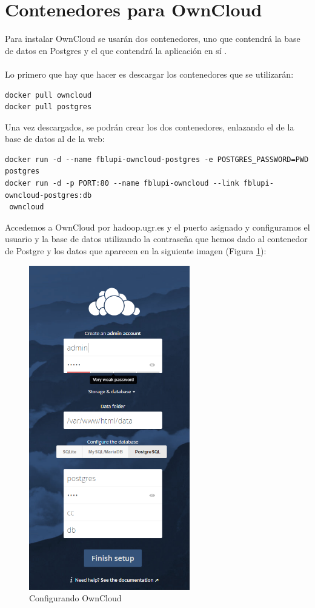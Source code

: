 \section{Contenedores para OwnCloud}

Para instalar OwnCloud se usarán dos contenedores, uno que contendrá la base de datos en Postgres y el que contendrá la aplicación en sí \cite{DockerOwnCloud}.
\\ \\
Lo primero que hay que hacer es descargar los contenedores que se utilizarán:

\begin{lstlisting}
docker pull owncloud
docker pull postgres
\end{lstlisting}

Una vez descargados, se podrán crear los dos contenedores, enlazando el de la base de datos al de la web:

\begin{lstlisting}
docker run -d --name fblupi-owncloud-postgres -e POSTGRES_PASSWORD=PWD postgres
docker run -d -p PORT:80 --name fblupi-owncloud --link fblupi-owncloud-postgres:db
 owncloud
\end{lstlisting}

Accedemos a OwnCloud por hadoop.ugr.es y el puerto asignado y configuramos el usuario y la base de datos utilizando la contraseña que hemos dado al contenedor de Postgre y los datos que aparecen en la siguiente imagen (Figura \ref{fig:owncloud-config}):

\begin{figure}[H]
	\centering
	\includegraphics[width=7cm]{img/owncloud-config}
	\caption{Configurando OwnCloud}
	\label{fig:owncloud-config}
\end{figure}

